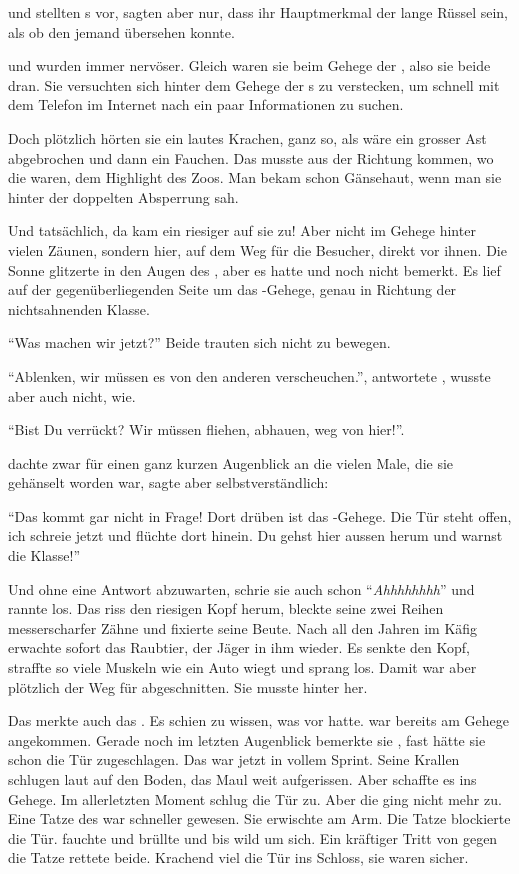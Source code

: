  und  stellten s vor, sagten aber nur, dass ihr Hauptmerkmal der lange Rüssel sein, als ob den jemand übersehen konnte.

 und  wurden immer nervöser. Gleich waren sie beim Gehege der , also sie beide dran. Sie versuchten sich hinter dem Gehege der s zu verstecken, um schnell mit dem Telefon im Internet nach ein paar Informationen zu suchen.

Doch plötzlich hörten sie ein lautes Krachen, ganz so, als wäre ein grosser Ast abgebrochen und dann ein Fauchen. Das musste aus der Richtung kommen, wo die  waren, dem Highlight des Zoos. Man bekam schon Gänsehaut, wenn man sie hinter der doppelten Absperrung sah.

Und tatsächlich, da kam ein riesiger  auf sie zu! Aber nicht im Gehege hinter vielen Zäunen, sondern hier, auf dem Weg für die Besucher, direkt vor ihnen. Die Sonne glitzerte in den Augen des , aber es hatte  und  noch nicht bemerkt. Es lief auf der gegenüberliegenden Seite um das -Gehege, genau in Richtung der nichtsahnenden Klasse.

\enquote{Was machen wir jetzt?} Beide trauten sich nicht zu bewegen.

\enquote{Ablenken, wir müssen es von den anderen verscheuchen.}, antwortete , wusste aber auch nicht, wie.

\enquote{Bist Du verrückt? Wir müssen fliehen, abhauen, weg von hier!}.

 dachte zwar für einen ganz kurzen Augenblick an die vielen Male, die sie gehänselt worden war, sagte aber selbstverständlich:

\enquote{Das kommt gar nicht in Frage! Dort drüben ist das -Gehege. Die Tür steht offen, ich schreie jetzt und flüchte dort hinein. Du gehst hier aussen herum und warnst die Klasse!}

Und ohne eine Antwort abzuwarten, schrie sie auch schon \enquote{\textit{Ahhhhhhhh}} und rannte los. Das  riss den riesigen Kopf herum, bleckte seine zwei Reihen messerscharfer Zähne und fixierte seine Beute. Nach all den Jahren im Käfig erwachte sofort das Raubtier, der Jäger in ihm wieder. Es senkte den Kopf, straffte so viele Muskeln wie ein Auto wiegt und sprang los. Damit war aber plötzlich der Weg für  abgeschnitten. Sie musste hinter  her.

Das merkte auch das . Es schien zu wissen, was  vor hatte.  war bereits am Gehege angekommen. Gerade noch im letzten Augenblick bemerkte sie , fast hätte sie schon die Tür zugeschlagen. Das  war jetzt in vollem Sprint. Seine Krallen schlugen laut auf den Boden, das Maul weit aufgerissen. Aber  schaffte es ins Gehege. Im allerletzten Moment schlug  die Tür zu. Aber die ging nicht mehr zu. Eine Tatze des  war schneller gewesen. Sie erwischte  am Arm. Die Tatze blockierte die Tür.  fauchte und brüllte und bis wild um sich. Ein kräftiger Tritt von  gegen die Tatze rettete beide. Krachend viel die Tür ins Schloss, sie waren sicher.

